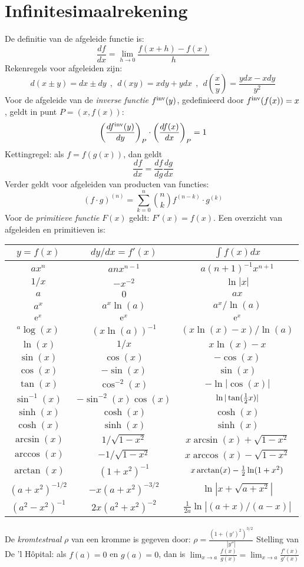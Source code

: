 \section{Infinitesimaalrekening}
De definitie van de afgeleide functie is:
\[
\frac{df}{dx}=\lim_{h\rightarrow0}\frac{f(x+h)-f(x)}{h}
\]
Rekenregels voor afgeleiden zijn:
\[
d(x\pm y)=dx\pm dy~~,~~d(xy)=xdy+ydx~~,~~d\left(\frac{x}{y}\right)=\frac{ydx-xdy}{y^2}
\]
Voor de afgeleide van de {\it inverse functie} $f^{\rm inv}(y)$, gedefinieerd
door $f^{\rm inv}(f(x))=x$, geldt in punt $P=(x,f(x))$:
\[
\left(\frac{df^{\rm inv}(y)}{dy}\right)_P\cdot\left(\frac{df(x)}{dx}\right)_P=1
\]
Kettingregel: als $f=f(g(x))$, dan geldt
\[
\frac{df}{dx}=\frac{df}{dg}\frac{dg}{dx}
\]
Verder geldt voor afgeleiden van producten van functies:
\[
(f\cdot g)^{(n)}=\sum\limits_{k=0}^n{n\choose k}f^{(n-k)}\cdot g^{(k)}
\]
Voor de {\it primitieve functie} $F(x)$ geldt: $F'(x)=f(x)$.
Een overzicht van afgeleiden en primitieven is:
\begin{center}
\begin{tabular}{||c|c|c||}
\hline
\boldmath$y=f(x)$\unboldmath&\boldmath$dy/dx=f'(x)$\unboldmath&\boldmath$\int f(x)dx$\rule{0pt}{12pt}\rule[-7pt]{0pt}{0pt}\unboldmath\\
\hline
\hline
$ax^n$&$anx^{n-1}$&$a(n+1)^{-1}x^{n+1}$\rule{0pt}{12pt}\\
$1/x$&$-x^{-2}$&$\ln|x|$\\
$a$&$0$&$ax$\\
\hline
$a^x$&$a^x\ln(a)$&$a^x/\ln(a)$\rule{0pt}{12pt}\\
${\rm e}^x$&${\rm e}^x$&${\rm e}^x$\\
$^a\log(x)$&$(x\ln(a))^{-1}$&$(x\ln(x)-x)/\ln(a)$\\
$\ln(x)$&$1/x$&$x\ln(x)-x$\\
\hline
$\sin(x)$&$\cos(x)$&$-\cos(x)$\\
$\cos(x)$&$-\sin(x)$&$\sin(x)$\\
$\tan(x)$&$\cos^{-2}(x)$&$-\ln|\cos(x)|$\\
$\sin^{-1}(x)$&$-\sin^{-2}(x)\cos(x)$&$\ln|\tan(\mbox{$\frac{1}{2}$} x)|$\\
$\sinh(x)$&$\cosh(x)$&$\cosh(x)$\\
$\cosh(x)$&$\sinh(x)$&$\sinh(x)$\\
$\arcsin(x)$&$1/\sqrt{1-x^2}$&$x\arcsin(x)+\sqrt{1-x^2}$\\
$\arccos(x)$&$-1/\sqrt{1-x^2}$&$x\arccos(x)-\sqrt{1-x^2}$\\
$\arctan(x)$&$(1+x^2)^{-1}$&$x\arctan(x)-\mbox{$\frac{1}{2}$}\ln(1+x^2)$\rule[-7pt]{0pt}{0pt}\\
\hline
$(a+x^2)^{-1/2}$&$-x(a+x^2)^{-3/2}$&$\ln|x+\sqrt{a+x^2}|$\rule{0pt}{12pt}\\
$(a^2-x^2)^{-1}$&$2x(a^2+x^2)^{-2}$&$\displaystyle\frac{1}{2a}\ln|(a+x)/(a-x)|$\rule[-10pt]{0pt}{23pt}\\
\hline
\end{tabular}
\end{center}
De {\it kromtestraal} $\rho$ van een kromme is gegeven door:
$\displaystyle\rho=\frac{(1+(y')^2)^{3/2}}{|y''|}$
\npar
Stelling van De 'l H\^opital: als $f(a)=0$ en $g(a)=0$, dan is
$\displaystyle\lim_{x\rightarrow a}\frac{f(x)}{g(x)}=\lim_{x\rightarrow a}\frac{f'(x)}{g'(x)}$

